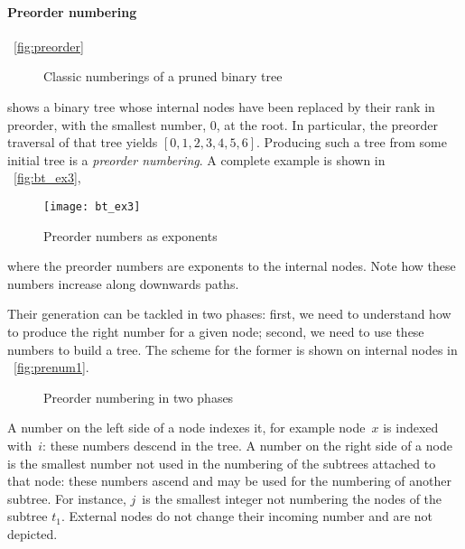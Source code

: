 \paragraph{Preorder numbering}

\Fig~\vref{fig:preorder}
\begin{figure}
\centering
{}
\;
\;
\;
\caption{Classic numberings of a pruned binary tree}
\label{fig:orders}
\end{figure}
shows a binary tree whose internal nodes have been replaced by their
rank in preorder, with the smallest number, \(0\), at the root. In
particular, the preorder traversal of that tree yields
\([0,1,2,3,4,5,6]\). Producing such a tree from some initial tree is a
\emph{preorder numbering}. A
complete example is shown in \fig~\vref{fig:bt_ex3},
\begin{figure}[b]
\centering
\texttt{[image: bt\_ex3]}
\caption{Preorder numbers as exponents}
\label{fig:bt_ex3}
\end{figure}
where the preorder numbers are exponents to the internal nodes. Note
how these numbers increase along downwards paths.

Their generation can be tackled in two phases: first, we need to
understand how to produce the right number for a given node; second,
we need to use these numbers to build a tree. The scheme for the
former is shown on internal nodes in \fig~\vref{fig:prenum1}.
\begin{figure}[t]
\centering
{}
\qquad
{}
\caption{Preorder numbering in two phases}
\label{fig:prenum}
\end{figure}
A number on the left side of a node indexes it, for example node~\(x\)
is indexed with~\(i\): these numbers descend in the tree. A number on
the right side of a node is the smallest number not used in the
numbering of the subtrees attached to that node: these numbers ascend
and may be used for the numbering of another subtree. For instance,
\(j\)~is the smallest integer not numbering the nodes of the subtree
\(t_1\). External nodes do not change their incoming number and are
not depicted.

